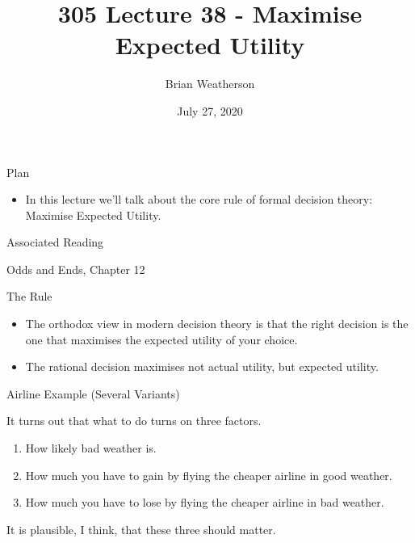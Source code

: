 \documentclass[
  ignorenonframetext,
]{beamer}
\title{305 Lecture 38 - Maximise Expected Utility}
\author{Brian Weatherson}
\date{July 27, 2020}
\providecommand{\tightlist}{%
  \setlength{\itemsep}{0pt}\setlength{\parskip}{0pt}}
\renewcommand{\,}{\text{, }}
\begin{document}
\frame{\titlepage}

\begin{frame}{Plan}
\protect\hypertarget{plan}{}

\begin{itemize}
\tightlist
\item
  In this lecture we'll talk about the core rule of formal decision
  theory: Maximise Expected Utility.
\end{itemize}

\end{frame}

\begin{frame}{Associated Reading}
\protect\hypertarget{associated-reading}{}

Odds and Ends, Chapter 12

\end{frame}

\begin{frame}{The Rule}
\protect\hypertarget{the-rule}{}

\begin{itemize}
\tightlist
\item
  The orthodox view in modern decision theory is that the right decision
  is the one that maximises the expected utility of your choice.
\item
  The rational decision maximises not actual utility, but expected
  utility.
\end{itemize}

\end{frame}

\begin{frame}{Airline Example (Several Variants)}
\protect\hypertarget{airline-example-several-variants}{}

It turns out that what to do turns on three factors.

\begin{enumerate}
\tightlist
\item
  How likely bad weather is.
\item
  How much you have to gain by flying the cheaper airline in good
  weather.
\item
  How much you have to lose by flying the cheaper airline in bad
  weather.
\end{enumerate}

It is plausible, I think, that these three should matter.

\end{frame}
\end{document}
